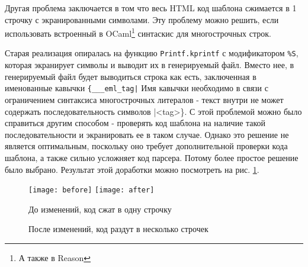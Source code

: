 Другая проблема заключается в том что весь HTML код шаблона сжимается в 1 строчку с экранированными символами.
Эту проблему можно решить, если использовать встроенный в OCaml\footnote{А также в Reason} синтаскис для многострочных строк.

Старая реализация опиралась на функцию \lstinline{Printf.kprintf} с модификатором \lstinline{%S}, которая экранирует символы и выводит их в генерируемый файл.
Вместо нее, в генерируемый файл будет выводиться строка как есть, заключенная в именованные кавычки
\lstinline{{___eml_tag|}
Имя кавычки необходимо в связи с ограничением синтаксиса многострочных литералов - текст внутри не может содержать последовательность символов |<tag>\}.
С этой проблемой можно было справиться другим способом - проверять код шаблона на наличие такой последовательности и экранировать ее в таком случае.
Однако это решение не является оптимальным, поскольку оно требует дополнительной проверки кода шаблона, а также сильно усложняет код парсера.
Потому более простое решение было выбрано.
Результат этой доработки можно посмотреть на рис. \ref{fig:improv}.

\begin{figure}[ht!]
    \texttt{[image: before]}\hfill
    \texttt{[image: after]}\hfill
    \caption{До изменений, код сжат в одну строчку}
    \caption{После изменений, код раздут в несколько строчек}
    \label{fig:improv}
\end{figure}
